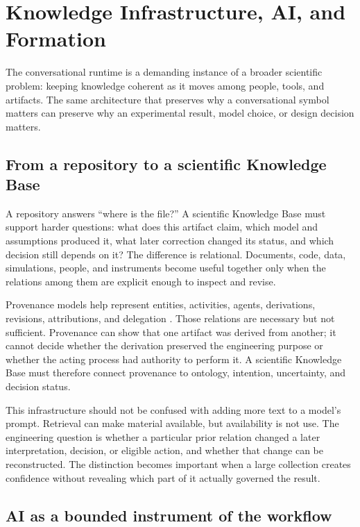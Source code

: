 \documentclass[10pt,a4paper]{article}
\begin{document}
\section{Knowledge Infrastructure, AI, and Formation}

The conversational runtime is a demanding instance of a broader scientific problem: keeping knowledge coherent as it moves among people, tools, and artifacts. The same architecture that preserves why a conversational symbol matters can preserve why an experimental result, model choice, or design decision matters.

\subsection{From a repository to a scientific Knowledge Base}

A repository answers ``where is the file?'' A scientific Knowledge Base must support harder questions: what does this artifact claim, which model and assumptions produced it, what later correction changed its status, and which decision still depends on it? The difference is relational. Documents, code, data, simulations, people, and instruments become useful together only when the relations among them are explicit enough to inspect and revise.

Provenance models help represent entities, activities, agents, derivations, revisions, attributions, and delegation \cite{provdm2013,provo2013}. Those relations are necessary but not sufficient. Provenance can show that one artifact was derived from another; it cannot decide whether the derivation preserved the engineering purpose or whether the acting process had authority to perform it. A scientific Knowledge Base must therefore connect provenance to ontology, intention, uncertainty, and decision status.

This infrastructure should not be confused with adding more text to a model's prompt. Retrieval can make material available, but availability is not use. The engineering question is whether a particular prior relation changed a later interpretation, decision, or eligible action, and whether that change can be reconstructed. The distinction becomes important when a large collection creates confidence without revealing which part of it actually governed the result.

\subsection{AI as a bounded instrument of the workflow}
\end{document}
